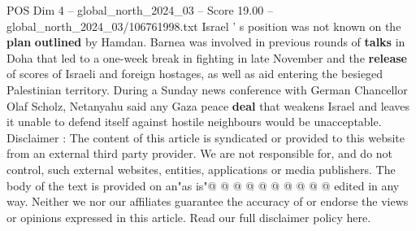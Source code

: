 \begin{textsample}{POS Dim 4 – global\_north\_2024\_03 – Score 19.00 – global\_north\_2024\_03/106761998.txt}
Israel ' s position was not known on the \textbf{plan} \textbf{outlined} by Hamdan.
Barnea was involved in previous rounds of \textbf{talks} in Doha that led to a one-week break in fighting in late November and the \textbf{release} of scores of Israeli and foreign hostages, as well as aid entering the besieged Palestinian territory.
During a Sunday news conference with German Chancellor Olaf Scholz, Netanyahu said any Gaza peace \textbf{deal} that weakens Israel and leaves it unable to defend itself against hostile neighbours would be unacceptable.
Disclaimer : The content of this article is syndicated or provided to this website from an external third party provider.
We are not responsible for, and do not control, such external websites, entities, applications or media publishers.
The body of the text is provided on an"as is"@ @ @ @ @ @ @ @ @ @ edited in any way.
Neither we nor our affiliates guarantee the accuracy of or endorse the views or opinions expressed in this article.
Read our full disclaimer policy here.

\end{textsample}
